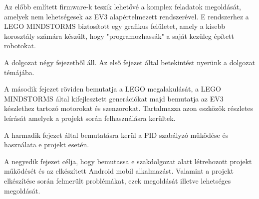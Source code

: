 Az előbb említett firmware-k teszik lehetővé a komplex feladatok megoldását, amelyek nem lehetségesek az EV3 alapértelmezett rendszerével. E rendszerhez a LEGO MINDSTORMS biztosított egy grafikus felületet, amely a kisebb korosztály számára készült, hogy "programozhassák" a saját kezűleg épített robotokat.

A dolgozat négy fejezetből áll. Az első fejezet által betekintést nyerünk a dolgozat témájába. 

A második fejezet röviden bemutatja a LEGO megalakulását, a LEGO MINDSTORMS által kifejlesztett generációkat majd bemutatja az EV3 készlethez tartozó motorokat és szenzorokat. Tartalmazza azon eszközök részletes leírását amelyek a projekt során felhasználásra kerültek.

A harmadik fejezet által bemutatásra kerül a PID szabályzó működése és használata e projekt esetén.

A negyedik fejezet célja, hogy bemutassa e szakdolgozat alatt létrehozott projekt működését és az elkészített Android mobil alkalmazást. Valamint a projekt elkészítése során felmerült problémákat, ezek megoldását illetve lehetséges megoldását.
